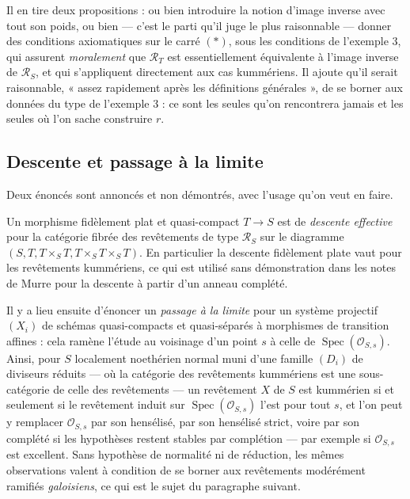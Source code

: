 \documentclass[11pt,a4paper]{article}
\begin{document}
Il en tire deux propositions : ou bien introduire la notion d'image inverse
avec tout son poids, ou bien --- c'est le parti qu'il juge le plus raisonnable
--- donner des conditions axiomatiques sur le carré $(\ast)$, sous les
conditions de l'exemple 3, qui assurent \emph{moralement} que
$\mathcal{R}_{T}$ est essentiellement équivalente à l'image inverse de
$\mathcal{R}_{S}$, et qui s'appliquent directement aux cas kummériens. Il
ajoute qu'il serait raisonnable, « assez rapidement après les définitions
générales », de se borner aux données du type de l'exemple 3 : ce sont les
seules qu'on rencontrera jamais et les seules où l'on sache construire $r$.

\subsection*{Descente et passage à la limite}

Deux énoncés sont annoncés et non démontrés, avec l'usage qu'on veut en faire.

Un morphisme fidèlement plat et quasi-compact $T \to S$ est de \emph{descente
effective} pour la catégorie fibrée des revêtements de type $\mathcal{R}_{S}$
sur le diagramme $(S, T, T\times_{S}T, T\times_{S}T\times_{S}T)$. En
particulier la descente fidèlement plate vaut pour les revêtements kummériens,
ce qui est utilisé sans démonstration dans les notes de Murre pour la descente
à partir d'un anneau complété.

Il y a lieu ensuite d'énoncer un \emph{passage à la limite} pour un système
projectif $(X_{i})$ de schémas quasi-compacts et quasi-séparés à morphismes de
transition affines : cela ramène l'étude au voisinage d'un point $s$ à celle de
$\operatorname{Spec}(\mathcal{O}_{S,s})$. Ainsi, pour $S$ localement noethérien
normal muni d'une famille $(D_{i})$ de diviseurs réduits --- où la catégorie
des revêtements kummériens est une sous-catégorie de celle des revêtements ---
un revêtement $X$ de $S$ est kummérien si et seulement si le revêtement induit
sur $\operatorname{Spec}(\mathcal{O}_{S,s})$ l'est pour tout $s$, et l'on peut
y remplacer $\mathcal{O}_{S,s}$ par son hensélisé, par son hensélisé strict,
voire par son complété si les hypothèses restent stables par complétion --- par
exemple si $\mathcal{O}_{S,s}$ est excellent. Sans hypothèse de normalité ni de
réduction, les mêmes observations valent à condition de se borner aux
revêtements modérément ramifiés \emph{galoisiens}, ce qui est le sujet du
paragraphe suivant.

\end{document}
